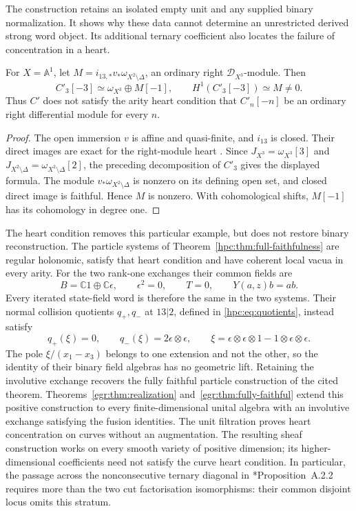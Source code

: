 The construction retains an isolated empty unit and any supplied binary
normalization. It shows why these data cannot determine an unrestricted
derived strong word object. Its additional ternary coefficient also
locates the failure of concentration in a heart.

\begin{lemma}\label{ogd:lem:binary-invisible-heart}
For $X=\mathbb A^1$, let
$M=i_{13,*}v_*\omega_{X^2\setminus\Delta}$, an ordinary right
$\mathcal D_{X^3}$-module. Then
\[
 C'_3[-3]\simeq\omega_{X^3}\oplus M[-1],\qquad
 H^1(C'_3[-3])\simeq M\ne0.
\]
Thus $C'$ does not satisfy the arity heart condition that
$C'_n[-n]$ be an ordinary right differential module for every $n$.
\end{lemma}

\begin{proof}
The open immersion $v$ is affine and quasi-finite, and $i_{13}$ is
closed. Their direct images are exact for the right-module heart
\cite[\S\S2.1.2--2.1.3]{chhop:BD}. Since
$J_{X^3}=\omega_{X^3}[3]$ and
$J_{X^2\setminus\Delta}=\omega_{X^2\setminus\Delta}[2]$,
the preceding decomposition of $C'_3$ gives the displayed formula.
The module $v_*\omega_{X^2\setminus\Delta}$ is nonzero on its
defining open set, and closed direct image is faithful. Hence $M$
is nonzero. With cohomological shifts, $M[-1]$ has its cohomology
in degree one.
\end{proof}

The heart condition removes this particular example, but does not
restore binary reconstruction. The particle systems of
Theorem~\ref{hpc:thm:full-faithfulness} are regular holonomic,
satisfy that heart condition and have coherent local vacua in every
arity. For the two rank-one exchanges their common fields are
\[
 B=\mathbb C1\oplus\mathbb C\epsilon,\qquad \epsilon^2=0,
 \qquad T=0,\qquad Y(a,z)b=ab.
\]
Every iterated state-field word is therefore the same in the two
systems. Their normal collision quotients $q_+,q_-$ at $13|2$,
defined in \eqref{hpc:eq:quotients}, instead satisfy
\[
 q_+(\xi)=0,\qquad q_-(\xi)=2\epsilon\otimes\epsilon,
 \qquad
 \xi=\epsilon\otimes\epsilon\otimes1
       -1\otimes\epsilon\otimes\epsilon.
\]
The pole $\xi/(x_1-x_3)$ belongs to one extension and not the other,
so the identity of their binary field algebras has no geometric
lift. Retaining the involutive exchange recovers the fully faithful
particle construction of the cited theorem.
Theorems~\ref{egr:thm:realization} and~\ref{egr:thm:fully-faithful}
extend this positive construction to every finite-dimensional unital
algebra with an involutive exchange satisfying the fusion identities.
The unit filtration proves heart concentration on curves without an
augmentation. The resulting sheaf construction works on every smooth
variety of positive dimension; its higher-dimensional coefficients
need not satisfy the curve heart condition.
In particular, the passage across the nonconsecutive ternary diagonal in
\cite{interfaces-Lat}*{Proposition~A.2.2} requires more than the two cut
factorisation isomorphisms: their common disjoint locus omits this stratum.

